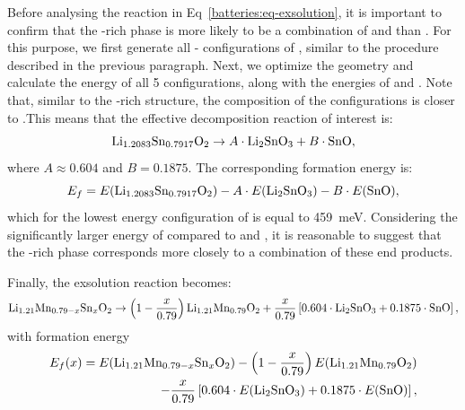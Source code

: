 \begin{refsection}
Before analysing the reaction in Eq~\ref{batteries:eq-exsolution}, it is important to confirm that the -rich phase is more likely to be a combination of  and  than . For this purpose, we first generate all - configurations of , similar to the procedure described in the previous paragraph. Next, we optimize the geometry and calculate the energy of all 5 configurations, along with the energies of  and . Note that, similar to the -rich  structure, the composition of the configurations is closer to .This means that the effective decomposition reaction of interest is:
\begin{equation} \label{batteries:eq-Sn-decomposition}
\ce{Li_{1.2083}Sn_{0.7917}O2} \rightarrow  A  \cdot \ce{Li2SnO3} + B \cdot \ce{SnO},
\end{equation}
where $A \approx 0.604$ and $B = 0.1875$. The corresponding formation energy is:
\begin{equation}
E_f = E(\ce{Li_{1.2083}Sn_{0.7917}O2}) - A \cdot E(\ce{Li2SnO3}) - B \cdot E(\ce{SnO}),
\end{equation}
which for the lowest energy configuration of  is equal to 459~\si{\milli\electronvolt}. Considering the significantly larger energy of  compared to  and , it is reasonable to suggest that the -rich phase corresponds more closely to a combination of these end products.

Finally, the exsolution reaction becomes:
\begin{equation} \label{batteries:eq-exsolution_final}
 \ce{Li_{1.21}Mn_{0.79-x}Sn_xO2} \rightarrow  \left( 1 - \frac{x}{0.79} \right) \ce{Li_{1.21}Mn_{0.79}O2} +  \frac{x}{0.79} \left[  0.604 \cdot \ce{Li2SnO3} + 0.1875 \cdot \ce{SnO} \right],
\end{equation}
with formation energy
\begin{align} \label{batteries:eq-exsolution_final_formation}
 E_f(x) = E(\ce{Li_{1.21}Mn_{0.79-x}Sn_xO2}) -  \left( 1 - \frac{x}{0.79} \right) E(\ce{Li_{1.21}Mn_{0.79}O2}) \\ -  \frac{x}{0.79} \left[  0.604 \cdot E(\ce{Li2SnO3}) + 0.1875 \cdot E(\ce{SnO}) \right],
\end{align}



\end{refsection}
